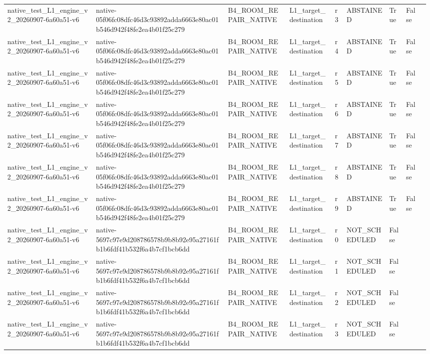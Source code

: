\begin{tabular}{lllllllll}
native\_test\_L1\_engine\_v2\_20260907-6a60a51-v6 & native-05f06fc08dfc46d3c93892adda6663e80ac01b546d942f48fe2ea4b01f25c279 & B4\_ROOM\_REPAIR\_NATIVE & L1\_target\_destination & r3 & ABSTAINED & True & False &  \\
native\_test\_L1\_engine\_v2\_20260907-6a60a51-v6 & native-05f06fc08dfc46d3c93892adda6663e80ac01b546d942f48fe2ea4b01f25c279 & B4\_ROOM\_REPAIR\_NATIVE & L1\_target\_destination & r4 & ABSTAINED & True & False &  \\
native\_test\_L1\_engine\_v2\_20260907-6a60a51-v6 & native-05f06fc08dfc46d3c93892adda6663e80ac01b546d942f48fe2ea4b01f25c279 & B4\_ROOM\_REPAIR\_NATIVE & L1\_target\_destination & r5 & ABSTAINED & True & False &  \\
native\_test\_L1\_engine\_v2\_20260907-6a60a51-v6 & native-05f06fc08dfc46d3c93892adda6663e80ac01b546d942f48fe2ea4b01f25c279 & B4\_ROOM\_REPAIR\_NATIVE & L1\_target\_destination & r6 & ABSTAINED & True & False &  \\
native\_test\_L1\_engine\_v2\_20260907-6a60a51-v6 & native-05f06fc08dfc46d3c93892adda6663e80ac01b546d942f48fe2ea4b01f25c279 & B4\_ROOM\_REPAIR\_NATIVE & L1\_target\_destination & r7 & ABSTAINED & True & False &  \\
native\_test\_L1\_engine\_v2\_20260907-6a60a51-v6 & native-05f06fc08dfc46d3c93892adda6663e80ac01b546d942f48fe2ea4b01f25c279 & B4\_ROOM\_REPAIR\_NATIVE & L1\_target\_destination & r8 & ABSTAINED & True & False &  \\
native\_test\_L1\_engine\_v2\_20260907-6a60a51-v6 & native-05f06fc08dfc46d3c93892adda6663e80ac01b546d942f48fe2ea4b01f25c279 & B4\_ROOM\_REPAIR\_NATIVE & L1\_target\_destination & r9 & ABSTAINED & True & False &  \\
native\_test\_L1\_engine\_v2\_20260907-6a60a51-v6 & native-5697c97e9d208786578b9b8b92e95a27161fb1b6fdf41b532f6a4b7cf1bcb6dd & B4\_ROOM\_REPAIR\_NATIVE & L1\_target\_destination & r0 & NOT\_SCHEDULED & False &  &  \\
native\_test\_L1\_engine\_v2\_20260907-6a60a51-v6 & native-5697c97e9d208786578b9b8b92e95a27161fb1b6fdf41b532f6a4b7cf1bcb6dd & B4\_ROOM\_REPAIR\_NATIVE & L1\_target\_destination & r1 & NOT\_SCHEDULED & False &  &  \\
native\_test\_L1\_engine\_v2\_20260907-6a60a51-v6 & native-5697c97e9d208786578b9b8b92e95a27161fb1b6fdf41b532f6a4b7cf1bcb6dd & B4\_ROOM\_REPAIR\_NATIVE & L1\_target\_destination & r2 & NOT\_SCHEDULED & False &  &  \\
native\_test\_L1\_engine\_v2\_20260907-6a60a51-v6 & native-5697c97e9d208786578b9b8b92e95a27161fb1b6fdf41b532f6a4b7cf1bcb6dd & B4\_ROOM\_REPAIR\_NATIVE & L1\_target\_destination & r3 & NOT\_SCHEDULED & False &  &  \\

\end{tabular}

